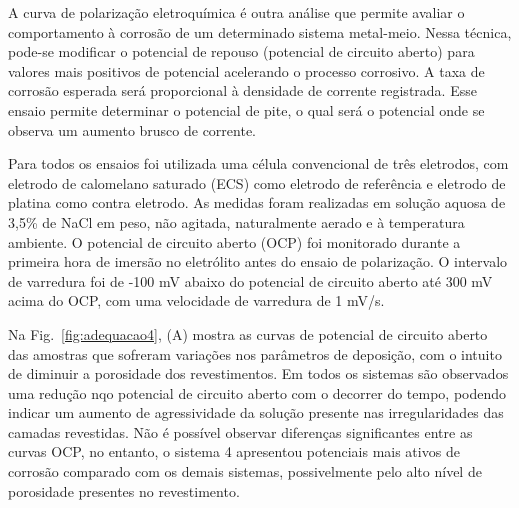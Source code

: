 A curva de polarização eletroquímica é outra análise que permite avaliar o
comportamento à corrosão de um determinado sistema metal-meio. Nessa técnica,
pode-se modificar o potencial de repouso (potencial de circuito aberto) para
valores mais positivos de potencial acelerando o processo corrosivo. A taxa de
corrosão esperada será proporcional à densidade de corrente registrada. Esse
ensaio permite determinar o potencial de pite, o qual será o potencial onde se
observa um aumento brusco de corrente.

Para todos os ensaios foi utilizada uma célula convencional de três eletrodos,
com eletrodo de calomelano saturado (ECS) como eletrodo de referência e eletrodo
de platina como contra eletrodo. As medidas foram realizadas em solução aquosa
de 3,5\% de NaCl em peso, não agitada, naturalmente aerado e à temperatura
ambiente. O potencial de circuito aberto (OCP) foi monitorado durante a primeira
hora de imersão no eletrólito antes do ensaio de polarização. O intervalo de
varredura foi de -100 mV abaixo do potencial de circuito aberto até 300 mV acima
do OCP, com uma velocidade de varredura de 1 mV/s.

Na Fig.~\ref{fig:adequacao4}, (A) mostra as curvas de potencial de circuito
aberto das amostras que sofreram variações nos parâmetros de deposição, com o
intuito de diminuir a porosidade dos revestimentos. Em todos os sistemas são
observados uma redução nqo potencial de circuito aberto com o decorrer do tempo,
podendo indicar um aumento de agressividade da solução presente nas
irregularidades das camadas revestidas.
Não é possível observar diferenças significantes entre as curvas OCP, no
entanto, o sistema 4 apresentou potenciais mais ativos de corrosão comparado com
os demais sistemas, possivelmente pelo alto nível de porosidade presentes no
revestimento.

